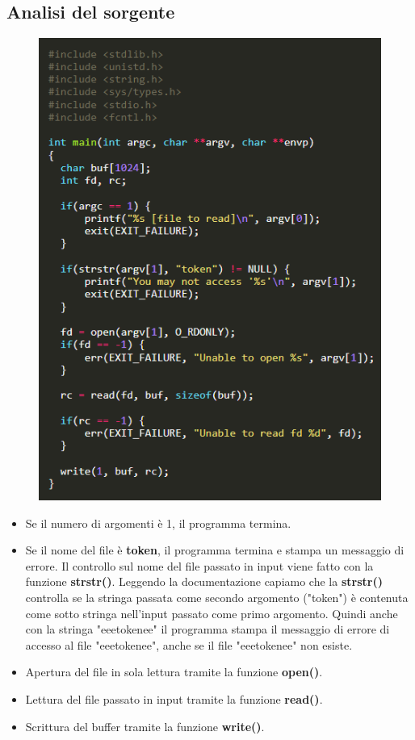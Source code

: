 \subsection{Analisi del sorgente}
\begin{figure}[h]
    \includegraphics[scale=1]{Capitolo 2/Figure/levle04.png}
\end{figure}
\begin{itemize}
    \item Se il numero di argomenti è 1, il programma termina.
    \item Se il nome del file è \textbf{token}, il programma termina e stampa un messaggio di errore.
    Il controllo sul nome del file passato in input viene fatto con la funzione \textbf{strstr()}. Leggendo la documentazione capiamo che la \textbf{strstr()} controlla se la stringa passata come secondo argomento ("token") è contenuta come sotto stringa nell’input passato come primo argomento. Quindi anche con la stringa "eeetokenee" il programma stampa il messaggio di errore di accesso al file "eeetokenee", anche se il file "eeetokenee" non esiste.
    \item Apertura del file in sola lettura tramite la funzione \textbf{open()}.
    \item Lettura del file passato in input tramite la funzione \textbf{read()}.
    \item Scrittura del buffer tramite la funzione \textbf{write()}.
\end{itemize}
